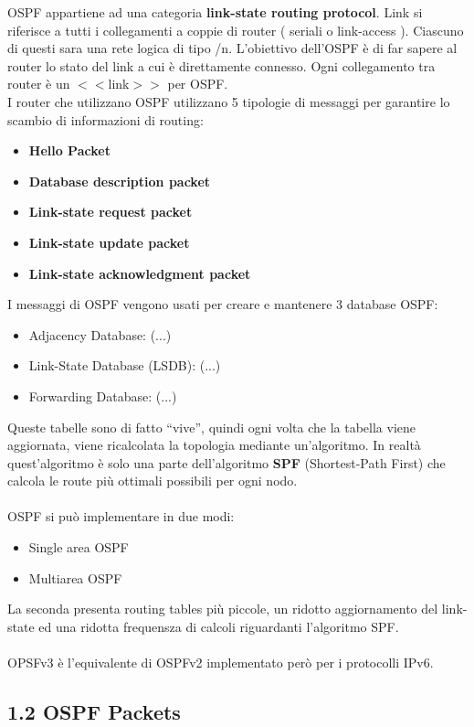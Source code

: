 \documentclass[12pt, a4paper]{article}
\begin{document}
	OSPF appartiene ad una categoria \textbf{link-state routing protocol}. Link si riferisce a tutti i collegamenti a coppie di router ( seriali o link-access ). Ciascuno di questi sara una rete logica di tipo /n. L'obiettivo dell'OSPF è di far sapere al router lo stato del link a cui è direttamente connesso. Ogni collegamento tra router è un $<<$link$>>$ per OSPF. \\
	I router che utilizzano OSPF utilizzano 5 tipologie di messaggi per garantire lo scambio di informazioni di routing:
	\begin{itemize}
		\item \textbf{Hello Packet}
		\item \textbf{Database description packet}
		\item \textbf{Link-state request packet}
		\item \textbf{Link-state update packet}
		\item \textbf{Link-state acknowledgment packet}
	\end{itemize}
	
	I messaggi di OSPF vengono usati per creare e mantenere 3 database OSPF:
	\begin{itemize}
		\item Adjacency Database: (...)
		\item Link-State Database (LSDB): (...)
		\item Forwarding Database: (...)
	\end{itemize}

	Queste tabelle sono di fatto ``vive'', quindi ogni volta che la tabella viene aggiornata, viene ricalcolata la topologia mediante un'algoritmo. In realtà quest'algoritmo è solo una parte dell'algoritmo \textbf{SPF} (Shortest-Path First) che calcola le route più ottimali possibili per ogni nodo. \\ \\
	OSPF si può implementare in due modi:
	\begin{itemize}
		\item Single area OSPF
		\item Multiarea OSPF
	\end{itemize} 
	La seconda presenta routing tables più piccole, un ridotto aggiornamento del link-state ed una ridotta frequensza di calcoli riguardanti l'algoritmo SPF. 
	\\ \\
	OPSFv3 è l'equivalente di OSPFv2 implementato però per i protocolli IPv6.
	
	\subsection*{1.2 OSPF Packets}
\end{document}
